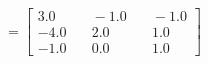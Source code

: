 \documentclass[preview]{standalone}
\begin{document}
\begin{align*}
=\begin{bmatrix} 3.0 & \quad -1.0 & \quad -1.0 \\ -4.0 & \quad 2.0 & \quad 1.0 \\ -1.0 & \quad 0.0 & \quad 1.0 \end{bmatrix}
\end{align*}
\end{document}
